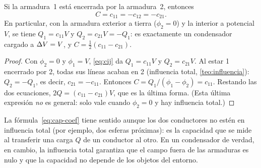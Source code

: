 \begin{corolario}\label{cor:encerrado}
Si la armadura~1 está encerrada por la armadura~2, entonces
\begin{equation}\label{eq:cap-encerrado}
  C=c_{11}=-c_{12}=-c_{21} .
\end{equation}
En particular, con la armadura exterior a tierra ($\phi_2=0$) y la interior a potencial $V$, se tiene $Q_1=c_{11}V$ y $Q_2=c_{21}V=-Q_1$: es exactamente un
condensador cargado a $\Delta V=V$, y $C=\tfrac12(c_{11}-c_{21})$.
\end{corolario}
\begin{proof}
Con $\phi_2=0$ y $\phi_1=V$, \cref{eq:cij} da $Q_1=c_{11}V$ y $Q_2=c_{21}V$. Al estar 1 encerrado por 2, todas sus líneas acaban en 2 (influencia total,
\cref{teo:influencia}): $Q_2=-Q_1$, es decir, $c_{21}=-c_{11}$. Entonces $C=Q_1/(\phi_1-\phi_2)=c_{11}$. Restando las dos ecuaciones,
$2Q=(c_{11}-c_{21})V$, que es la última forma. (Esta última expresión \emph{no} es general: solo vale cuando $\phi_2=0$ y hay influencia total.)
\end{proof}

\begin{observacion}\label{obs:generalizado}
La fórmula~\eqref{eq:cap-coef} tiene sentido aunque los dos conductores no estén en influencia total (por ejemplo, dos esferas próximas): es la capacidad
que se mide al transferir una carga $Q$ de un conductor al otro. En un condensador de verdad, en cambio, la influencia total garantiza que el campo
fuera de las armaduras es nulo y que la capacidad no depende de los objetos del entorno.
\end{observacion}


